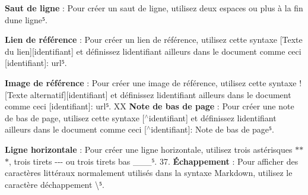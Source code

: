 {\bfseries Saut de ligne} \+: Pour créer un saut de ligne, utilisez deux espaces ou plus à la fin d\textquotesingle{}une ligne⁵.

{\bfseries Lien de référence} \+: Pour créer un lien de référence, utilisez cette syntaxe {\ttfamily \mbox{[}Texte du lien\mbox{]}\mbox{[}identifiant\mbox{]}} et définissez l\textquotesingle{}identifiant ailleurs dans le document comme ceci {\ttfamily \mbox{[}identifiant\mbox{]}\+: url}⁵.

{\bfseries Image de référence} \+: Pour créer une image de référence, utilisez cette syntaxe {\ttfamily !\mbox{[}Texte alternatif\mbox{]}\mbox{[}identifiant\mbox{]}} et définissez l\textquotesingle{}identifiant ailleurs dans le document comme ceci {\ttfamily \mbox{[}identifiant\mbox{]}\+: url}⁵. XX {\bfseries Note de bas de page} \+: Pour créer une note de bas de page, utilisez cette syntaxe {\ttfamily \mbox{[}$^\wedge$identifiant\mbox{]}} et définissez l\textquotesingle{}identifiant ailleurs dans le document comme ceci {\ttfamily \mbox{[}$^\wedge$identifiant\mbox{]}\+: Note de bas de page}⁵.

{\bfseries Ligne horizontale} \+: Pour créer une ligne horizontale, utilisez trois astérisques {\ttfamily $\ast$$\ast$$\ast$}, trois tirets {\ttfamily -\/-\/-\/} ou trois tirets bas {\ttfamily \+\_\+\+\_\+\+\_\+}⁵. 37. {\bfseries Échappement} \+: Pour afficher des caractères littéraux normalement utilisés dans la syntaxe Markdown, utilisez le caractère d\textquotesingle{}échappement {\ttfamily \textbackslash{}}⁵. 